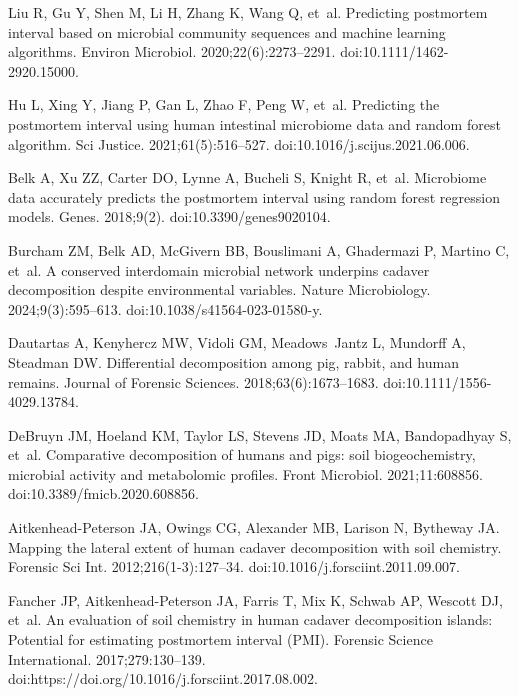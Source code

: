 \documentclass[
  10pt,
  letterpaper,
]{article}
\begin{document}
\begin{thebibliography}{10}
    Liu R, Gu Y, Shen M, Li H, Zhang K, Wang Q, et~al.
    \newblock Predicting postmortem interval based on microbial community sequences and machine learning algorithms.
    \newblock Environ Microbiol. 2020;22(6):2273--2291.
    \newblock doi:{10.1111/1462-2920.15000}.
    
    Hu L, Xing Y, Jiang P, Gan L, Zhao F, Peng W, et~al.
    \newblock Predicting the postmortem interval using human intestinal microbiome data and random forest algorithm.
    \newblock Sci Justice. 2021;61(5):516--527.
    \newblock doi:{10.1016/j.scijus.2021.06.006}.
    
    Belk A, Xu ZZ, Carter DO, Lynne A, Bucheli S, Knight R, et~al.
    \newblock Microbiome data accurately predicts the postmortem interval using random forest regression models.
    \newblock Genes. 2018;9(2).
    \newblock doi:{10.3390/genes9020104}.
    
    Burcham ZM, Belk AD, McGivern BB, Bouslimani A, Ghadermazi P, Martino C, et~al.
    \newblock A conserved interdomain microbial network underpins cadaver decomposition despite environmental variables.
    \newblock Nature Microbiology. 2024;9(3):595--613.
    \newblock doi:{10.1038/s41564-023-01580-y}.
    
    Dautartas A, Kenyhercz MW, Vidoli GM, Meadows~Jantz L, Mundorff A, Steadman DW.
    \newblock Differential decomposition among pig, rabbit, and human remains.
    \newblock Journal of Forensic Sciences. 2018;63(6):1673--1683.
    \newblock doi:{10.1111/1556-4029.13784}.
    
    DeBruyn JM, Hoeland KM, Taylor LS, Stevens JD, Moats MA, Bandopadhyay S, et~al.
    \newblock Comparative decomposition of humans and pigs: soil biogeochemistry, microbial activity and metabolomic profiles.
    \newblock Front Microbiol. 2021;11:608856.
    \newblock doi:{10.3389/fmicb.2020.608856}.
    
    Aitkenhead-Peterson JA, Owings CG, Alexander MB, Larison N, Bytheway JA.
    \newblock Mapping the lateral extent of human cadaver decomposition with soil chemistry.
    \newblock Forensic Sci Int. 2012;216(1-3):127--34.
    \newblock doi:{10.1016/j.forsciint.2011.09.007}.
    
    Fancher JP, Aitkenhead-Peterson JA, Farris T, Mix K, Schwab AP, Wescott DJ, et~al.
    \newblock An evaluation of soil chemistry in human cadaver decomposition islands: {Potential} for estimating postmortem interval ({PMI}).
    \newblock Forensic Science International. 2017;279:130--139.
    \newblock doi:{https://doi.org/10.1016/j.forsciint.2017.08.002}.
    

\end{thebibliography}
\end{document}

